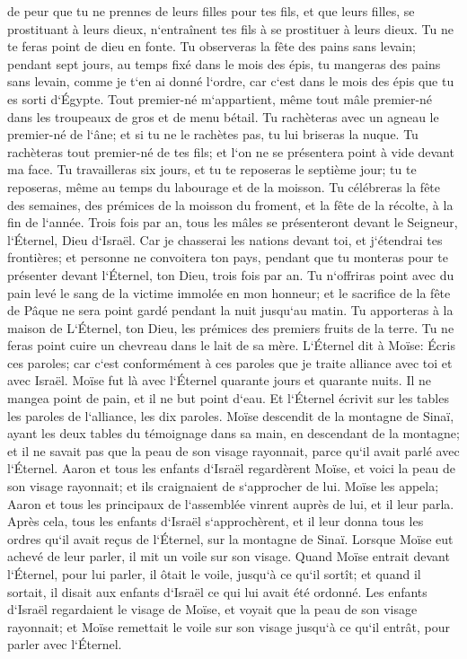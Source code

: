 \verse de peur que tu ne prennes de leurs filles pour tes fils, et que leurs filles, se prostituant à leurs dieux, n`entraînent tes fils à se prostituer à leurs dieux. 
\verse Tu ne te feras point de dieu en fonte. 
\verse Tu observeras la fête des pains sans levain; pendant sept jours, au temps fixé dans le mois des épis, tu mangeras des pains sans levain, comme je t`en ai donné l`ordre, car c`est dans le mois des épis que tu es sorti d`Égypte. 
\verse Tout premier-né m`appartient, même tout mâle premier-né dans les troupeaux de gros et de menu bétail. 
\verse Tu rachèteras avec un agneau le premier-né de l`âne; et si tu ne le rachètes pas, tu lui briseras la nuque. Tu rachèteras tout premier-né de tes fils; et l`on ne se présentera point à vide devant ma face. 
\verse Tu travailleras six jours, et tu te reposeras le septième jour; tu te reposeras, même au temps du labourage et de la moisson. 
\verse Tu célébreras la fête des semaines, des prémices de la moisson du froment, et la fête de la récolte, à la fin de l`année. 
\verse Trois fois par an, tous les mâles se présenteront devant le Seigneur, l`Éternel, Dieu d`Israël. 
\verse Car je chasserai les nations devant toi, et j`étendrai tes frontières; et personne ne convoitera ton pays, pendant que tu monteras pour te présenter devant l`Éternel, ton Dieu, trois fois par an. 
\verse Tu n`offriras point avec du pain levé le sang de la victime immolée en mon honneur; et le sacrifice de la fête de Pâque ne sera point gardé pendant la nuit jusqu`au matin. 
\verse Tu apporteras à la maison de L`Éternel, ton Dieu, les prémices des premiers fruits de la terre. Tu ne feras point cuire un chevreau dans le lait de sa mère. 
\verse L`Éternel dit à Moïse: Écris ces paroles; car c`est conformément à ces paroles que je traite alliance avec toi et avec Israël. 
\verse Moïse fut là avec l`Éternel quarante jours et quarante nuits. Il ne mangea point de pain, et il ne but point d`eau. Et l`Éternel écrivit sur les tables les paroles de l`alliance, les dix paroles. 
\verse Moïse descendit de la montagne de Sinaï, ayant les deux tables du témoignage dans sa main, en descendant de la montagne; et il ne savait pas que la peau de son visage rayonnait, parce qu`il avait parlé avec l`Éternel. 
\verse Aaron et tous les enfants d`Israël regardèrent Moïse, et voici la peau de son visage rayonnait; et ils craignaient de s`approcher de lui. 
\verse Moïse les appela; Aaron et tous les principaux de l`assemblée vinrent auprès de lui, et il leur parla. 
\verse Après cela, tous les enfants d`Israël s`approchèrent, et il leur donna tous les ordres qu`il avait reçus de l`Éternel, sur la montagne de Sinaï. 
\verse Lorsque Moïse eut achevé de leur parler, il mit un voile sur son visage. 
\verse Quand Moïse entrait devant l`Éternel, pour lui parler, il ôtait le voile, jusqu`à ce qu`il sortît; et quand il sortait, il disait aux enfants d`Israël ce qui lui avait été ordonné. 
\verse Les enfants d`Israël regardaient le visage de Moïse, et voyait que la peau de son visage rayonnait; et Moïse remettait le voile sur son visage jusqu`à ce qu`il entrât, pour parler avec l`Éternel. 

